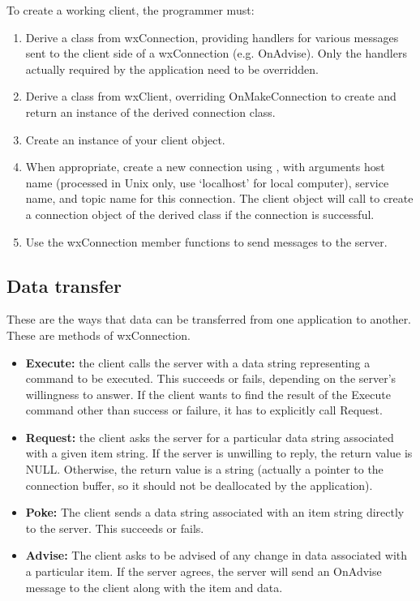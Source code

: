 To create a working client, the programmer must:

\begin{enumerate}\itemsep=0pt
\item Derive a class from wxConnection, providing handlers for various
messages sent to the client side of a wxConnection (e.g.
OnAdvise). Only the handlers actually required by the application
need to be overridden.
\item Derive a class from wxClient, overriding OnMakeConnection to
create and return an instance of the derived connection class.
\item Create an instance of your client object.
\item When appropriate, create a new connection using
,
with arguments host name (processed in Unix only, use `localhost'
for local computer), service name, and topic name for this
connection. The client object will call
 to create
a connection object of the derived class if the connection is
successful.
\item Use the wxConnection member functions to send messages to the server.
\end{enumerate}

\subsection{Data transfer}

These are the ways that data can be transferred from one
application to another. These are methods of wxConnection.

\begin{itemize}\itemsep=0pt
\item {\bf Execute:} the client calls the server with a data string representing
a command to be executed. This succeeds or fails, depending on the
server's willingness to answer. If the client wants to find the result
of the Execute command other than success or failure, it has to explicitly
call Request.
\item {\bf Request:} the client asks the server for a particular data string
associated with a given item string. If the server is unwilling to
reply, the return value is NULL. Otherwise, the return value is a string
(actually a pointer to the connection buffer, so it should not be
deallocated by the application).
\item {\bf Poke:} The client sends a data string associated with an item
string directly to the server. This succeeds or fails.
\item {\bf Advise:} The client asks to be advised of any change in data
associated with a particular item. If the server agrees, the server will
send an OnAdvise message to the client along with the item and data.
\end{itemize}

